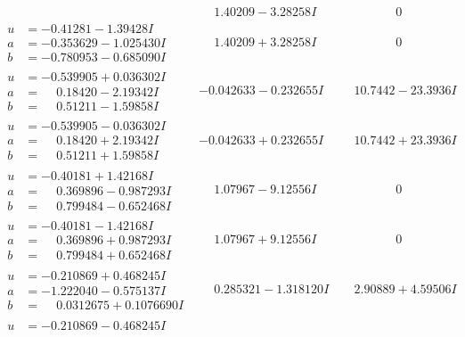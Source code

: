 \documentclass[1p]{elsarticle_modified}
\theoremstyle{definition}
\begin{document}
$$\begin{array}{c|c|c}
 & \phantom{-}1.40209 - 3.28258 I & \phantom{-0.000000 } 0 \\ \hline\begin{aligned}
u &= -0.41281 - 1.39428 I \\
a &= -0.353629 - 1.025430 I \\
b &= -0.780953 - 0.685090 I\end{aligned}
 & \phantom{-}1.40209 + 3.28258 I & \phantom{-0.000000 } 0 \\ \hline\begin{aligned}
u &= -0.539905 + 0.036302 I \\
a &= \phantom{-}0.18420 - 2.19342 I \\
b &= \phantom{-}0.51211 - 1.59858 I\end{aligned}
 & -0.042633 - 0.232655 I & \phantom{-}10.7442 - 23.3936 I \\ \hline\begin{aligned}
u &= -0.539905 - 0.036302 I \\
a &= \phantom{-}0.18420 + 2.19342 I \\
b &= \phantom{-}0.51211 + 1.59858 I\end{aligned}
 & -0.042633 + 0.232655 I & \phantom{-}10.7442 + 23.3936 I \\ \hline\begin{aligned}
u &= -0.40181 + 1.42168 I \\
a &= \phantom{-}0.369896 - 0.987293 I \\
b &= \phantom{-}0.799484 - 0.652468 I\end{aligned}
 & \phantom{-}1.07967 - 9.12556 I & \phantom{-0.000000 } 0 \\ \hline\begin{aligned}
u &= -0.40181 - 1.42168 I \\
a &= \phantom{-}0.369896 + 0.987293 I \\
b &= \phantom{-}0.799484 + 0.652468 I\end{aligned}
 & \phantom{-}1.07967 + 9.12556 I & \phantom{-0.000000 } 0 \\ \hline\begin{aligned}
u &= -0.210869 + 0.468245 I \\
a &= -1.222040 - 0.575137 I \\
b &= \phantom{-}0.0312675 + 0.1076690 I\end{aligned}
 & \phantom{-}0.285321 - 1.318120 I & \phantom{-}2.90889 + 4.59506 I \\ \hline\begin{aligned}
u &= -0.210869 - 0.468245 I \\

\end{aligned}
\end{array}$$
\end{document}
